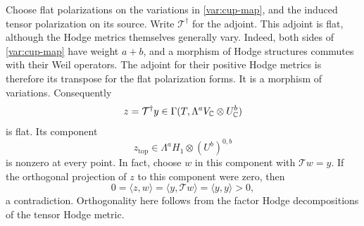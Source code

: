 Choose flat polarizations on the variations in
\eqref{var:cup-map}, and the induced tensor polarization on its
source.  Write $\mathcal T^\dagger$ for the adjoint.  This adjoint is
flat, although the Hodge metrics themselves generally vary.  Indeed,
both sides of \eqref{var:cup-map} have weight $a+b$, and a morphism of
Hodge structures commutes with their Weil operators.  The adjoint
for their positive Hodge metrics is therefore its transpose for the
flat polarization forms.  It is a morphism of variations.
Consequently
\begin{equation}
 z=\mathcal T^\dagger y
      \in\Gamma(T,\Lambda^a V_\mathbb C\otimes U^b_\mathbb C)
 \label{var:flat-z}
\end{equation}
is flat.  Its component
\begin{equation}
 z_{\mathrm{top}}\in
      \Lambda^a H_1\otimes(U^b)^{0,b}
 \label{var:z-top}
\end{equation}
is nonzero at every point.  In fact, choose $w$ in this component
with $\mathcal T w=y$.  If the orthogonal projection of $z$ to this
component were zero, then
\[
 0=\langle z,w\rangle
   =\langle y,\mathcal T w\rangle
   =\langle y,y\rangle>0,
\]
a contradiction.  Orthogonality here follows from the factor Hodge
decompositions of the tensor Hodge metric.


